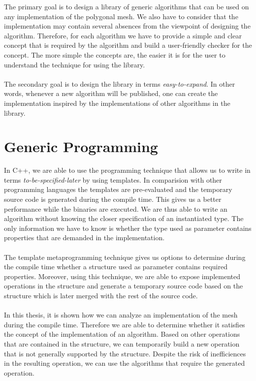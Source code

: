 The primary goal is to design a library of generic algorithms that can be used on any
implementation of the polygonal mesh. We also have to consider that the implementation
may contain several absences from the viewpoint of designing the algorithm. Therefore, for each
algorithm we have to provide a simple and clear concept that is required by the algorithm
and build a user-friendly checker for the concept. The more simple the concepts are, the easier
it is for the user to understand the technique for using the library.\\
\\
The secondary goal is to design the library in terms \emph{easy-to-expand}. In other words,
whenever a new algorithm will be published, one can create the implementation inspired
by the implementations of other algorithms in the library.

\section*{Generic Programming}

In C++, we are able to use the programming technique that allows us to write in terms
\emph{to-be-specified-later} by using templates. In comparision with other programming languages
the templates are pre-evaluated and the temporary source code is generated during the
compile time. This gives us a better performance while the binaries are executed.
We are thus able to write an algorithm
without knowing the closer specification of an instantiated type. The only information we have
to know is whether the type used as parameter contains properties that are demanded in the implementation.\\
\\
The template metaprogramming technique gives us options to determine during the compile time whether
a structure used as parameter contains required properties. Moreover, using this technique,
we are able to expose implemented operations in the structure and generate a temporary source
code based on the structure which is later merged with the rest of the source code.\\
\\
In this thesis, it is shown how we can analyze an implementation of the mesh during the compile time.
Therefore we are able to determine whether it satisfies the concept of the implementation of
an algorithm. Based on other operations that are contained in the structure, we can temporarily build a new
operation that is not generally supported by the structure. Despite the risk of inefficiences in
the resulting operation, we can use the algorithms that require the generated operation.
